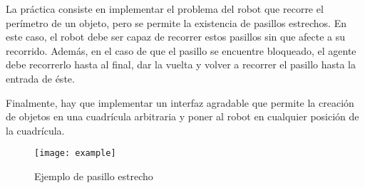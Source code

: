 La práctica consiste en implementar el problema del robot que recorre el perímetro de un objeto, pero se permite la existencia de pasillos estrechos. En este caso, el robot debe ser capaz de recorrer estos pasillos sin que afecte a su recorrido. Además, en el caso de que el pasillo se encuentre bloqueado, el agente debe recorrerlo hasta al final, dar la vuelta y volver a recorrer el pasillo hasta la entrada de éste.

Finalmente, hay que implementar un interfaz agradable que permite la creación de objetos en una cuadrícula arbitraria y poner al robot en cualquier posición de la cuadrícula.

\begin{figure}[!ht]
    \centering
    \texttt{[image: example]}
    \caption{Ejemplo de pasillo estrecho}
    \label{fig:ejemplo}
\end{figure}